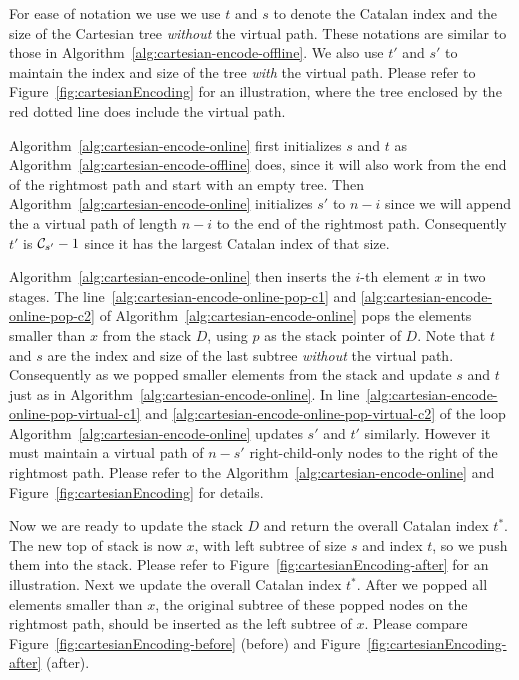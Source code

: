For ease of notation we use we use $t$ and $s$ to denote the Catalan
index and the size of the Cartesian tree {\em without} the virtual path.
These notations are similar to those in
Algorithm~\ref{alg:cartesian-encode-offline}.  We also use $t'$ and $s'$
to maintain the index and size of the tree {\em with} the virtual path.
Please refer to Figure~\ref{fig:cartesianEncoding} for an illustration,
where the tree enclosed by the red dotted line does include the virtual
path.

Algorithm~\ref{alg:cartesian-encode-online} first initializes $s$ and
$t$ as Algorithm~\ref{alg:cartesian-encode-offline} does, since it
will also work from the end of the rightmost path and start with an
empty tree.  Then Algorithm~\ref{alg:cartesian-encode-online}
initializes $s'$ to $n - i$ since we will append the a virtual path of
length $n - i$ to the end of the rightmost path.  Consequently $t'$ is
${\cal C}_{s'} - 1$ since it has the largest Catalan index of that
size.

Algorithm~\ref{alg:cartesian-encode-online} then inserts the $i$-th
element $x$ in two stages.  The
line~\ref{alg:cartesian-encode-online-pop-c1} and
\ref{alg:cartesian-encode-online-pop-c2} of
Algorithm~\ref{alg:cartesian-encode-online} pops the elements smaller
than $x$ from the stack $D$, using $p$ as the stack pointer of $D$. Note
that $t$ and $s$ are the index and size of the last subtree {\em
without} the virtual path.  Consequently as we popped smaller elements
from the stack and update $s$ and $t$ just as in
Algorithm~\ref{alg:cartesian-encode-online}.  In
line~\ref{alg:cartesian-encode-online-pop-virtual-c1} and
\ref{alg:cartesian-encode-online-pop-virtual-c2} of the loop
Algorithm~\ref{alg:cartesian-encode-online} updates $s'$ and $t'$
similarly.  However it must maintain a virtual path of $n - s'$
right-child-only nodes to the right of the rightmost path.  Please refer
to the Algorithm~\ref{alg:cartesian-encode-online} and
Figure~\ref{fig:cartesianEncoding} for details.



Now we are ready to update the stack $D$ and return the overall Catalan
index $t^*$.  The new top of stack is now $x$, with left subtree of size
$s$ and index $t$, so we push them into the stack. Please refer to
Figure~\ref{fig:cartesianEncoding-after} for an illustration.  Next we
update the overall Catalan index $t^*$.  After we popped all elements
smaller than $x$, the original subtree of these popped nodes on the
rightmost path, should be inserted as the left subtree of $x$.  Please
compare Figure~\ref{fig:cartesianEncoding-before} (before) and
Figure~\ref{fig:cartesianEncoding-after} (after).

